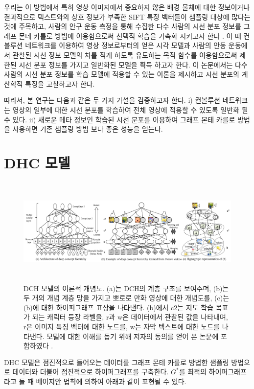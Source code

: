 \documentclass{kcc}
\begin{document}
우리는 이 방법에서 특히 영상 이미지에서 중요하지 않은 배경 물체에 대한 정보이거나 결과적으로 텍스트와의 상호 정보가 부족한 SIFT 특징 벡터들이 샘플링 대상에 많다는 것에 주목하고, 사람의 안구 운동 측정을 통해 수집한 다수 사람의 시선 분포 정보를 그래프 몬테 카를로 방법에 이용함으로써 선택적 학습을 가속화 시키고자 한다 \cite{Oh2011}. 이 때 컨볼루션 네트워크를 이용하여 영상 정보로부터의 얻은 시각 모델과 사람의 안동 운동에서 관찰된 시선 정보 모델의 차를 적게 하도록 유도하는 목적 함수를 이용함으로써 제한된 시선 분포 정보를 가지고 일반화된 모델을 획득 하고자 한다. 이 논문에서는 다수 사람의 시선 분포 정보를 학습 모델에 적용할 수 있는 이론을 제시하고 시선 분포의 계산학적 특징을 고찰하고자 한다.

따라서, 본 연구는 다음과 같은 두 가지 가설을 검증하고자 한다. i) 컨볼루션 네트워크는 영상의 일부에 대한 시선 분포를 학습하여 전체 영상에 적용할 수 있도록 일반화 될 수 있다. ii) 새로운 메타 정보인 학습된 시선 분포를 이용하여 그래프 몬테 카를로 방법을 사용하면 기존 샘플링 방법 보다 좋은 성능을 얻는다.

\section{DHC 모델}

\begin{figure}
  \centerline{\includegraphics[width=180mm,height=54mm]{eps/ha2015_fig2.png}}
  \caption{DCH 모델의 이론적 개념도. (a)는 DCH의 계층 구조를 보여주며, (b)는 두 개의 개념 계층 망을 가지고 뽀로로 만화 영상에 대한 개념도를, (c)는 (b)에 대한 하이퍼그래프 표상을 나타낸다. (b)에서 c2는 지도 학습 목표가 되는 캐릭터 등장 라벨을, r과 w은 데이터에서 관찰된 값을 나타내며, r은 이미지 특징 벡터에 대한 노드를, w는 자막 텍스트에 대한 노드를 나타낸다. 모델에 대한 이해를 돕기 위해 저자의 동의를 얻어 본 논문에 포함하였다 \cite{Ha2015}.}
  \label{fig:ha2015}
\end{figure}

DHC 모델은 점진적으로 들어오는 데이터를 그래프 몬테 카를로 방법한 샘플링 방법으로 데이터와 더불어 점진적으로 하이퍼그래프를 구축한다. $G^{*}$를 최적의 하이퍼그래프라고 둘 때 베이지안 법칙에 의하여 아래과 같이 표현될 수 있다.
\end{document}
